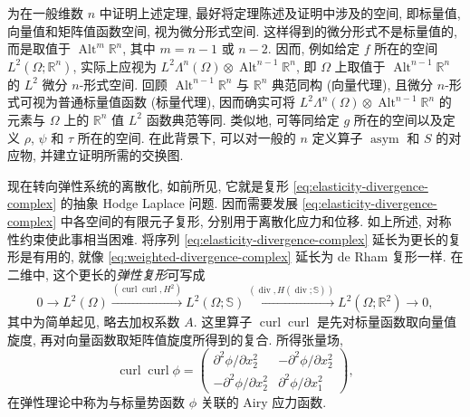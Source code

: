 
\begin{Remark}\label{rem:elasticity-general-dimension}
{为在一般维数 $n$ 中证明上述定理, 最好将定理陈述及证明中涉及的空间, 即标量值, 向量值和矩阵值函数空间, 视为微分形式空间. 这样得到的微分形式不是标量值的, 而是取值于 $\operatorname{Alt}^m\mathbb R^n$, 其中 $m=n-1$ 或 $n-2$. 因而, 例如给定 $f$ 所在的空间 $L^2(\Omega;\mathbb R^n)$, 实际上应视为 $L^2\Lambda^n(\Omega)\otimes\operatorname{Alt}^{n-1}\mathbb R^n$, 即 $\Omega$ 上取值于 $\operatorname{Alt}^{n-1}\mathbb R^n$ 的 $L^2$ 微分 $n$-形式空间. 回顾 $\operatorname{Alt}^{n-1}\mathbb R^n$ 与 $\mathbb R^n$ 典范同构 (向量代理), 且微分 $n$-形式可视为普通标量值函数 (标量代理), 因而确实可将 $L^2\Lambda^n(\Omega)\otimes\operatorname{Alt}^{n-1}\mathbb R^n$ 的元素与 $\Omega$ 上的 $\mathbb R^n$ 值 $L^2$ 函数典范等同. 类似地, 可等同给定 $g$ 所在的空间以及定义 $\rho$, $\psi$ 和 $\tau$ 所在的空间. 在此背景下, 可以对一般的 $n$ 定义算子 $\operatorname{asym}$ 和 $S$ 的对应物, 并建立证明所需的交换图.}
\end{Remark}

{现在转向弹性系统的离散化, 如前所见, 它就是复形 \eqref{eq:elasticity-divergence-complex} 的抽象 Hodge Laplace 问题. 因而需要发展 \eqref{eq:elasticity-divergence-complex} 中各空间的有限元子复形, 分别用于离散化应力和位移. 如上所述, 对称性约束使此事相当困难. 将序列 \eqref{eq:elasticity-divergence-complex} 延长为更长的复形是有用的, 就像 \eqref{eq:weighted-divergence-complex} 延长为 de Rham 复形一样. 在二维中, 这个更长的\emph{弹性复形}可写成}
\begin{equation}\label{eq:two-dimensional-elasticity-complex}
0\to L^2(\Omega)\xrightarrow{(\operatorname{curl}\operatorname{curl},H^2)}L^2(\Omega;\mathbb S)\xrightarrow{(\operatorname{div},H(\operatorname{div};\mathbb S))}L^2(\Omega;\mathbb R^2)\to0,
\end{equation}
{其中为简单起见, 略去加权系数 $A$. 这里算子 $\operatorname{curl}\operatorname{curl}$ 是先对标量函数取向量值旋度, 再对向量函数取矩阵值旋度所得到的复合. 所得张量场,}
\[
\operatorname{curl}\operatorname{curl}\phi=
\begin{pmatrix}\partial^2\phi/\partial x_2^2&-\partial^2\phi/\partial x_2^2\\-\partial^2\phi/\partial x_2^2&\partial^2\phi/\partial x_1^2\end{pmatrix},
\]
{在弹性理论中称为与标量势函数 $\phi$ 关联的 Airy 应力函数.}


